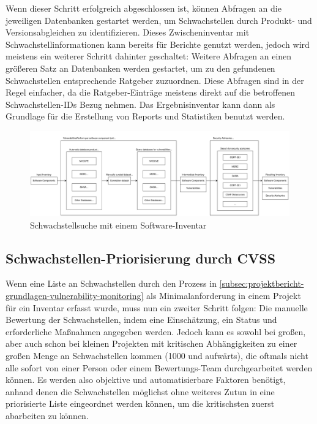 Wenn dieser Schritt erfolgreich abgeschlossen ist, können Abfragen an die jeweiligen Datenbanken gestartet werden, um Schwachstellen durch Produkt- und Versionsabgleichen zu identifizieren.
Dieses Zwischeninventar mit Schwachstellinformationen kann bereits für Berichte genutzt werden, jedoch wird meistens ein weiterer Schritt dahinter geschaltet:
Weitere Abfragen an einen größeren Satz an Datenbanken werden gestartet, um zu den gefundenen Schwachstellen entsprechende Ratgeber zuzuordnen.
Diese Abfragen sind in der Regel einfacher, da die Ratgeber-Einträge meistens direkt auf die betroffenen Schwachstellen-IDs Bezug nehmen.
Das Ergebnisinventar kann dann als Grundlage für die Erstellung von Reports und Statistiken benutzt werden.

\begin{figure}[htbp] %
    \centering
    \includegraphics[width=1\textwidth, keepaspectratio]{res/grafiken/vulnerability-monitoring-overview}
    \caption{Schwachstellsuche mit einem Software-Inventar}
    \label{fig:vulnerability-monitoring-overview-figure}
\end{figure}

\subsection{Schwachstellen-Priorisierung durch CVSS} \label{subsec:projektbericht-grundlagen-vulnerability-assessment}

Wenn eine Liste an Schwachstellen durch den Prozess in \ref{subsec:projektbericht-grundlagen-vulnerability-monitoring} als Minimalanforderung in einem Projekt für ein Inventar erfasst wurde, muss nun ein zweiter Schritt folgen:
Die manuelle Bewertung der Schwachstellen, indem eine Einschätzung, ein Status und erforderliche Maßnahmen angegeben werden.
Jedoch kann es sowohl bei großen, aber auch schon bei kleinen Projekten mit kritischen Abhängigkeiten zu einer großen Menge an Schwachstellen kommen (1000 und aufwärts), die oftmals nicht alle sofort von einer Person oder einem Bewertungs-Team durchgearbeitet werden können.
Es werden also objektive und automatisierbare Faktoren benötigt, anhand denen die Schwachstellen möglichst ohne weiteres Zutun in eine priorisierte Liste eingeordnet werden können, um die kritischsten zuerst abarbeiten zu können.

